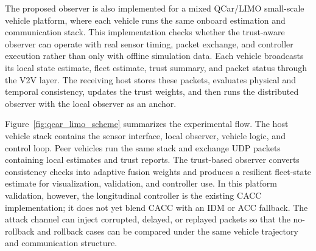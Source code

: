 \documentclass[journal,twoside]{IEEEtran}
\begin{document}
The proposed observer is also implemented for a mixed QCar/LIMO small-scale vehicle platform, where each vehicle runs the same onboard estimation and communication stack. This implementation checks whether the trust-aware observer can operate with real sensor timing, packet exchange, and controller execution rather than only with offline simulation data. Each vehicle broadcasts its local state estimate, fleet estimate, trust summary, and packet status through the V2V layer. The receiving host stores these packets, evaluates physical and temporal consistency, updates the trust weights, and then runs the distributed observer with the local observer as an anchor.

Figure~\ref{fig:qcar_limo_scheme} summarizes the experimental flow. The host vehicle stack contains the sensor interface, local observer, vehicle logic, and control loop. Peer vehicles run the same stack and exchange UDP packets containing local estimates and trust reports. The trust-based observer converts consistency checks into adaptive fusion weights and produces a resilient fleet-state estimate for visualization, validation, and controller use. In this platform validation, however, the longitudinal controller is the existing CACC implementation; it does not yet blend CACC with an IDM or ACC fallback. The attack channel can inject corrupted, delayed, or replayed packets so that the no-rollback and rollback cases can be compared under the same vehicle trajectory and communication structure.
\end{document}
